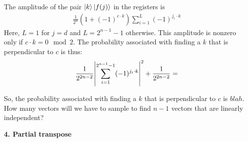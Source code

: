 \documentclass{article}
\theoremstyle{definition}
\newcommand{\f}[2]{\frac{#1}{#2}}
\begin{document}
\begin{enumerate}[label=(\alph*)]
	The amplitude of the pair $\ket{k}\ket{f(j)}$ in the registers is 
	\begin{align*}
		\f{1}{2^n}(1 + (-1)^{c\cdot k}) \sum_{i=1}^L (-1)^{j_i\cdot k}
	\end{align*} 
	Here, $L=1$ for $j=d$ and $L = 2^{n-1}-1$ otherwise. This amplitude is nonzero only if $c\cdot k = 0 \mod 2$. The probability associated with finding a $k$ that is perpendicular to $c$ is thus:
	\begin{align*}
		\f{1}{2^{2n-2}} \abs{\sum_{i=1}^{2^{n-1}-1} (-1)^{j_i\cdot k}}^2 + \f{1}{2^{2n-2}} =  
	\end{align*}
	
	
	So, the probability associated with finding a $k$ that is perpendicular to $c$ is $blah$.   How many vectors will we have to sample to find $n-1$ vectors that are linearly independent? 
	
	

\end{enumerate}



\noindent \textbf{4. Partial transpose}
\end{document}
